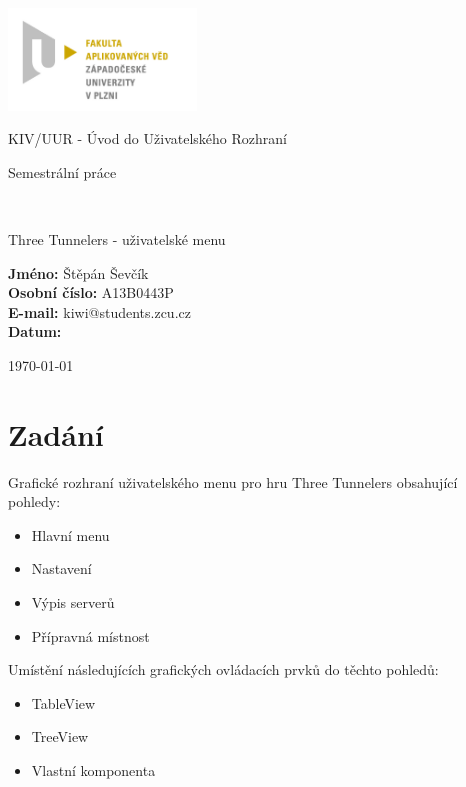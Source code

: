 \documentclass[12pt,a4paper]{article}
\author{Jan Šmejkal}
\let\oldsection\section
\renewcommand\section{\clearpage\oldsection}
\begin{document}
\begin{titlepage}

\includegraphics[width=50mm]{img/FAV.jpg}
\\[160 pt]
\centerline{ \Huge \sc KIV/UUR - Úvod do Uživatelského Rozhraní}
\centerline{ \huge \sc Semestrální práce }
\\[12 pt]
{\large \sc
\centerline{Three Tunnelers - uživatelské menu}
}


{
\vfill 
\parindent=0cm
\textbf{Jméno:} Štěpán Ševčík\\
\textbf{Osobní číslo:} A13B0443P\\
\textbf{E-mail:} kiwi@students.zcu.cz\\
\textbf{Datum:} {\large \today\par} %

}

\end{titlepage}


\newpage
\setcounter{page}{2}
\setcounter{tocdepth}{3}
\tableofcontents



\section{Zadání}
Grafické rozhraní uživatelského menu pro hru Three Tunnelers obsahující pohledy:
\begin{itemize}
\item Hlavní menu
\item Nastavení
\item Výpis serverů
\item Přípravná místnost
\end{itemize}
Umístění následujících grafických ovládacích prvků do těchto pohledů:
\begin{itemize}
\item TableView
\item TreeView
\item Vlastní komponenta
\end{itemize}
\end{document}
